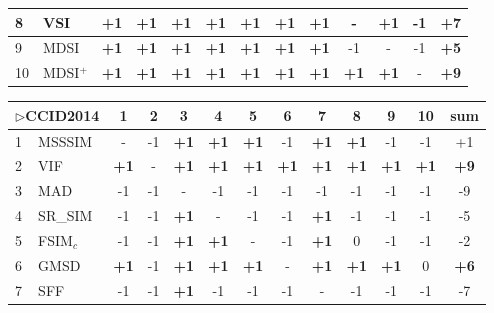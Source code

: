 \begin{table*}[htb]
{\begin{tabular}{|l|l|c|c|c|c|c|c|c|c|c|c||c|}
8         & VSI            & \textbf{+1} & \textbf{+1} & \textbf{+1} & \textbf{+1} & \textbf{+1} & \textbf{+1} & \textbf{+1} & -           & \textbf{+1} & -1 & \textbf{+7} \\ \hline
9         & MDSI           & \textbf{+1} & \textbf{+1} & \textbf{+1} & \textbf{+1} & \textbf{+1} & \textbf{+1} & \textbf{+1} & -1          & -           & -1 & \textbf{+5} \\ \hline
10        & MDSI$^+$          & \textbf{+1} & \textbf{+1} & \textbf{+1} & \textbf{+1} & \textbf{+1} & \textbf{+1} & \textbf{+1} & \textbf{+1} & \textbf{+1} & -  & \textbf{+9} \\ \hline
\end{tabular}
\newline
\vspace*{2 mm}
\newline
\begin{tabular}{|l|l|c|c|c|c|c|c|c|c|c|c||c|}
\hline
\multicolumn{2}{|c|}{$\rhd$CCID2014} & 1           & 2  & 3           & 4           & 5           & 6           & 7           & 8           & 9           & 10          & sum         \\ \hline
1           & MSSSIM           & -           & -1 & \textbf{+1} & \textbf{+1} & \textbf{+1} & -1          & \textbf{+1} & \textbf{+1} & -1          & -1          & +1          \\ \hline
2           & VIF              & \textbf{+1} & -  & \textbf{+1} & \textbf{+1} & \textbf{+1} & \textbf{+1} & \textbf{+1} & \textbf{+1} & \textbf{+1} & \textbf{+1} & \textbf{+9} \\ \hline
3           & MAD              & -1          & -1 & -           & -1          & -1          & -1          & -1          & -1          & -1          & -1          & -9          \\ \hline
4           & SR\_SIM          & -1          & -1 & \textbf{+1} & -           & -1          & -1          & \textbf{+1} & -1          & -1          & -1          & -5          \\ \hline
5           & FSIM$_c$            & -1          & -1 & \textbf{+1} & \textbf{+1} & -           & -1          & \textbf{+1} & 0           & -1          & -1          & -2          \\ \hline
6           & GMSD             & \textbf{+1} & -1 & \textbf{+1} & \textbf{+1} & \textbf{+1} & -           & \textbf{+1} & \textbf{+1} & \textbf{+1} & 0           & \textbf{+6} \\ \hline
7           & SFF              & -1          & -1 & \textbf{+1} & -1          & -1          & -1          & -           & -1          & -1          & -1          & -7          \\ \hline

\end{tabular}}
\end{table*}
